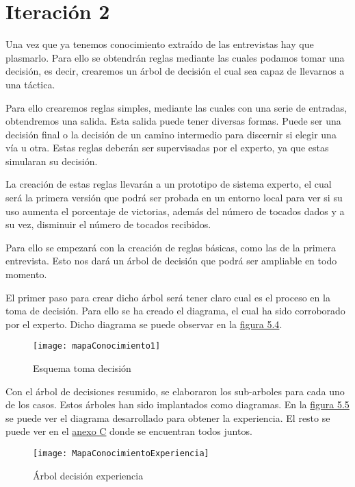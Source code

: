 \section{Iteración 2}

Una vez que ya tenemos conocimiento extraído de las entrevistas hay que plasmarlo.
Para ello se obtendrán reglas mediante las cuales podamos tomar una decisión, es decir,
crearemos un árbol de decisión el cual sea capaz de llevarnos a una táctica.

Para ello crearemos reglas simples, mediante las cuales con una serie de entradas,
obtendremos una salida. Esta salida puede tener diversas formas. Puede ser una decisión final
o la decisión de un camino intermedio para discernir si elegir una vía u otra.
Estas reglas deberán ser supervisadas por el experto, ya que estas simularan su decisión.

La creación de estas reglas llevarán a un prototipo de sistema experto, el cual será
la primera versión que podrá ser probada en un entorno local para ver si su uso aumenta
el porcentaje de victorias, además del número de tocados dados y a su vez, disminuir el
número de tocados recibidos.

Para ello se empezará con la creación de reglas básicas, como las de la primera entrevista. Esto
nos dará un árbol de decisión que podrá ser ampliable en todo momento.

El primer paso para crear dicho árbol será tener claro cual es el proceso en la toma de decisión.
Para ello se ha creado el diagrama, el cual ha sido corroborado por el experto. Dicho diagrama
se puede observar en la \hyperref[fig:Esquema toma decisión]{figura 5.4}.

\begin{figure}[htb]
  \centering
    \texttt{[image: mapaConocimiento1]}
  \caption[Esquema toma decisión]{Esquema toma decisión}
  \label{fig:Esquema toma decisión}
\end{figure}


Con el árbol de decisiones resumido, se elaboraron los sub-arboles para cada uno de los casos.
Estos árboles han sido implantados como diagramas. En la \hyperref[fig:Arbol decisión experiencia]{figura 5.5} se puede ver el diagrama
desarrollado para obtener la experiencia. El resto se puede ver en el \hyperref[cap:Diagramas toma decisión]{anexo C} donde se encuentran
todos juntos.

\begin{figure}[htb]
  \centering
    \texttt{[image: MapaConocimientoExperiencia]}
  \caption[Árbol decisión experiencia]{Árbol decisión experiencia}
  \label{fig:Arbol decisión experiencia}
\end{figure}

